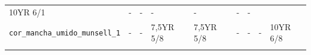 \documentclass[a4paper,dvipsnames]{tufte-book}
\begin{document}
\begin{longtable}[]{@{}lllllllll@{}}
\begin{minipage}[t]{0.06\columnwidth}
10YR 6/1\strut
\end{minipage} & \begin{minipage}[t]{0.07\columnwidth}\raggedright\strut
-\strut
\end{minipage} & \begin{minipage}[t]{0.07\columnwidth}\raggedright\strut
-\strut
\end{minipage} & \begin{minipage}[t]{0.07\columnwidth}\raggedright\strut
-\strut
\end{minipage} & \begin{minipage}[t]{0.07\columnwidth}\raggedright\strut
-\strut
\end{minipage} & \begin{minipage}[t]{0.07\columnwidth}\raggedright\strut
-\strut
\end{minipage} & \begin{minipage}[t]{0.06\columnwidth}\raggedright\strut
-\strut
\end{minipage}\tabularnewline
\begin{minipage}[t]{0.21\columnwidth}\raggedright\strut
\texttt{cor\_mancha\_umido\_munsell\_1}\strut
\end{minipage} & \begin{minipage}[t]{0.06\columnwidth}\raggedright\strut
-\strut
\end{minipage} & \begin{minipage}[t]{0.06\columnwidth}\raggedright\strut
-\strut
\end{minipage} & \begin{minipage}[t]{0.07\columnwidth}\raggedright\strut
7,5YR 5/8\strut
\end{minipage} & \begin{minipage}[t]{0.07\columnwidth}\raggedright\strut
7,5YR 5/8\strut
\end{minipage} & \begin{minipage}[t]{0.07\columnwidth}\raggedright\strut
-\strut
\end{minipage} & \begin{minipage}[t]{0.07\columnwidth}\raggedright\strut
-\strut
\end{minipage} & \begin{minipage}[t]{0.07\columnwidth}\raggedright\strut
-\strut
\end{minipage} & \begin{minipage}[t]{0.06\columnwidth}\raggedright\strut
10YR 6/8\strut
\end{minipage}\tabularnewline
\begin{minipage}[t]{0.21\columnwidth}\raggedright\strut

\end{minipage}
\end{longtable}
\end{document}
